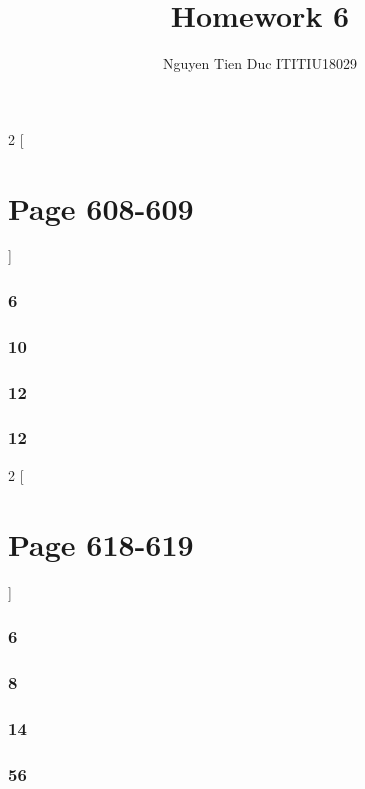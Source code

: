 \documentclass[12pt]{article}
\begin{document}
  \title{Homework 6}
  \author{Nguyen Tien Duc ITITIU18029}
  \maketitle
  \begin{multicols}{2}
    [\part*{Page 608-609}]
      \section*{6}
      \section*{10}

      \section*{12}

      \section*{12}
  \end{multicols}

  \begin{multicols}{2}
    [\part*{Page 618-619}]
    \section*{6}
    \section*{8}
    \section*{14}
    \section*{56}
  \end{multicols}
\end{document}
